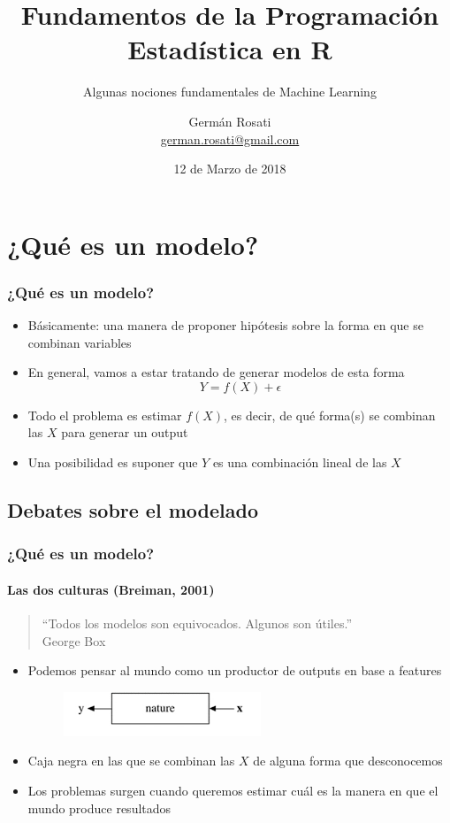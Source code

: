\documentclass{beamer}
\title[Regresión Lineal]{Fundamentos de la Programación Estadística en R}
\subtitle{Algunas nociones fundamentales de Machine Learning}
\author{Germán Rosati \\ \href{ german.rosati@gmail.com}{german.rosati@gmail.com}}
\institute{UNTREF - UNSAM - Digital House}
\date{12 de Marzo de 2018}
\begin{document}
\frame{\titlepage}

\section{¿Qué es un modelo?}
\begin{frame}
\frametitle{¿Qué es un modelo?}
	\begin{itemize}
		\item{Básicamente: una manera de proponer hipótesis sobre la forma en que se combinan variables}
		\item{En general, vamos a estar tratando de generar modelos de esta forma 
			\begin{equation}
				Y = f(X) + \epsilon
			\end{equation}}
		\item{Todo el problema es estimar $f(X)$, es decir, de qué forma(s) se combinan las $X$ para generar un output}
		\item{Una posibilidad es suponer que $Y$ es una combinación lineal de las $X$}
	\end{itemize}
\end{frame}


\subsection{Debates sobre el modelado}
\begin{frame}
	\frametitle{¿Qué es un modelo?}
	\framesubtitle{Las dos culturas (Breiman, 2001)}
	\begin{quotation}
		``Todos los modelos son equivocados. Algunos son útiles.''\\ George Box
	\end{quotation}
	\begin{itemize}
		\item{Podemos pensar al mundo como un productor de outputs en base a features}
		
		\begin{figure}
			\centering
			\includegraphics[width=0.5\linewidth, height=0.15\textheight]{img/two_cult_nature}
		\end{figure}
		
		\item{Caja negra en las que se combinan las $X$ de alguna forma que desconocemos}
		\item{Los problemas surgen cuando queremos estimar cuál es la manera en que el mundo produce resultados}
	\end{itemize}
\end{frame}
\end{document}
